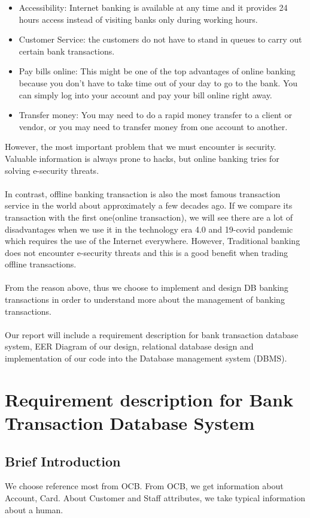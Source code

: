 \documentclass[12pt,a4paper]{article}
\begin{document}
\begin{itemize}
    \item Accessibility: Internet banking is available at any time and it provides 24 hours access instead of visiting banks only during working hours.
    \item Customer Service: the customers do not have to stand in queues to carry out certain bank transactions.
    \item Pay bills online: This might be one of the top advantages of online banking because you don’t have to take time out of your day to go to the bank. You can simply log into your account and pay your bill online right away.
    \item Transfer money: You may need to do a rapid money transfer to a client or vendor, or you may need to transfer money from one account to another.
\end{itemize}

\indent However, the most important problem that we must encounter is security. Valuable information is always prone to hacks, but online banking tries for solving e-security threats.\\\\
\indent In contrast, offline banking transaction is also the most famous transaction service in the world about approximately a few decades ago. If we compare its transaction with the first one(online transaction), we will see there are a lot of disadvantages when we use it in the technology era 4.0 and 19-covid pandemic which requires the use of the Internet everywhere. However, Traditional banking does not encounter e-security threats and this is a good benefit when trading offline transactions.\\\\
\indent From the reason above, thus we choose to implement and design DB banking transactions in order to understand more about the management of banking transactions.\\\\
\indent Our report will include a requirement description for bank transaction database system, EER Diagram of our design, relational database design and implementation of our code into the Database management system (DBMS).

\section{Requirement description for Bank Transaction Database System}
\subsection{Brief Introduction}
\indent We choose reference most from OCB. From OCB, we get information about Account, Card. About Customer and Staff attributes, we take typical information about a human.
\end{document}
